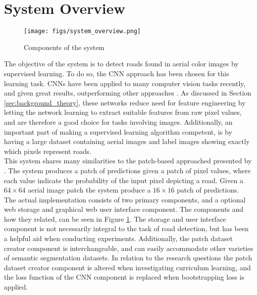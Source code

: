 \section{System Overview}
\label{sec:systemOverview}
\begin{figure}[t]
\begin{center}
\texttt{[image: figs/system\_overview.png]}
\caption[Components of the system]{Components of the system}
\label{fig:system_components}
\end{center}
\end{figure}

The objective of the system is to detect roads found in aerial color images by supervised learning. To do so, the \ac{CNN} approach has been chosen for this learning task. \ac{CNN}s have been applied to many computer vision tasks recently, and given great results, outperforming other approaches \citep{Krizhevsky_imagenet} . As discussed in Section \ref{sec:background_theory}, these networks reduce need for feature engineering by letting the network learning to extract suitable features from raw pixel values, and are therefore a good choice for tasks involving images. Additionally, an important part of making a supervised learning algorithm competent, is by having a large dataset containing aerial images and label images showing exactly which pixels represent roads.\\

This system shares many similarities to the patch-based approached presented by \cite{Mnih_aerial_images_noisy}. The system produces a patch of predictions given a patch of pixel values, where each value indicate the probability of the input pixel depicting a road. Given a $64 \times 64$ aerial image patch the system produce a $16 \times 16$ patch of predictions.\\


The actual implementation consists of two primary components, and a optional web storage and graphical web user interface component. The components and how they related, can be seen in Figure \ref{fig:system_components}. The storage and user interface component is not necessarily  integral to the task of road detection, but has been a helpful aid when conducting experiments. Additionally, the patch dataset creator component is interchangeable, and can easily accommodate other varieties of semantic segmentation datasets. In relation to the research questions the patch dataset creator component is altered when investigating curriculum learning, and the loss function of the \ac{CNN} component is replaced when bootstrapping loss is applied. \\


